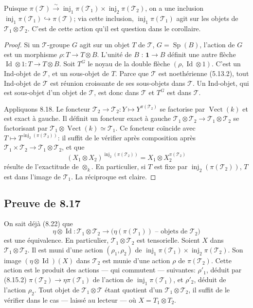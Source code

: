 \documentclass[12pt,a4paper]{article}
\theoremstyle{plain}
\theoremstyle{definition}
\DeclareMathOperator{\Sp}{Sp}
\DeclareMathOperator{\Id}{Id}
\DeclareMathOperator{\Vect}{Vect}
\DeclareMathOperator{\inj}{inj}
\begin{document}
Puisque $\pi(\mathcal{T}) \xrightarrow{\sim} \inj_1 \pi(\mathcal{T}_1) \times \inj_2 \pi(\mathcal{T}_2)$, on a une inclusion $\inj_1 \pi(\mathcal{T}_1) \hookrightarrow \pi(\mathcal{T})$; via cette inclusion, $\inj_1 \pi(\mathcal{T}_1)$ agit sur les objets de $\mathcal{T}_1 \otimes \mathcal{T}_2$. C'est de cette action qu'il est question dans le corollaire.

\begin{proof}
Si un $\mathcal{T}$-groupe $G$ agit sur un objet $T$ de $\mathcal{T}$, $G = \Sp(B)$, l'action de $G$ est un morphisme $\rho : T \to T \otimes B$. L'unité de $B$ : $\mathbf{1} \to B$ définit une autre flèche $\Id \otimes 1 : T \to T \otimes B$. Soit $T^G$ le noyau de la double flèche $(\rho, \Id \otimes 1)$. C'est un Ind-objet de $\mathcal{T}$, et un sous-objet de $T$. Parce que $\mathcal{T}$ est noethérienne (5.13.2), tout Ind-objet de $\mathcal{T}$ est réunion croissante de ses sous-objets dans $\mathcal{T}$. Un Ind-objet, qui est sous-objet d'un objet de $\mathcal{T}$, est donc dans $\mathcal{T}$ et $T^G$ est dans $\mathcal{T}$.

Appliquons 8.18. Le foncteur $\mathcal{T}_2 \to \mathcal{T}_2 : Y \mapsto Y^{\pi(\mathcal{T}_2)}$ se factorise par $\Vect(k)$ et est exact à gauche. Il définit un foncteur exact à gauche $\mathcal{T}_1 \otimes \mathcal{T}_2 \to \mathcal{T}_1 \otimes \mathcal{T}_2$ se factorisant par $\mathcal{T}_1 \otimes \Vect(k) \simeq \mathcal{T}_1$. Ce foncteur coïncide avec $T \mapsto T^{\inj_2(\pi(\mathcal{T}_2))}$: il suffit de le vérifier après composition après $\mathcal{T}_1 \times \mathcal{T}_2 \to \mathcal{T}_1 \otimes \mathcal{T}_2$, et que
\[
(X_1 \otimes X_2)^{\inj_2(\pi(\mathcal{T}_2))} = X_1 \otimes X_2^{\pi(\mathcal{T}_2)}
\]
résulte de l'exactitude de $\otimes_k$. En particulier, si $T$ est fixe par $\inj_2(\pi(\mathcal{T}_2))$, $T$ est dans l'image de $\mathcal{T}_1$. La réciproque est claire.
\end{proof}

\subsection{Preuve de 8.17}

On sait déjà (8.22) que
\[
\eta \otimes \Id : \mathcal{T}_1 \otimes \mathcal{T}_2 \to \text{($\eta(\pi(\mathcal{T}_1))$ -- objets de $\mathcal{T}_2$)}
\]
est une équivalence. En particulier, $\mathcal{T}_1 \otimes \mathcal{T}_2$ est tensorielle. Soient $X$ dans $\mathcal{T}_1 \otimes \mathcal{T}_2$. Il est muni d'une action $(\rho_1, \rho_2)$ de $\inj_1 \pi(\mathcal{T}_1) \times \inj_2 \pi(\mathcal{T}_2)$. Son image $(\eta \otimes \Id)(X)$ dans $\mathcal{T}_2$ est munie d'une action $\rho$ de $\pi(\mathcal{T}_2)$. Cette action est le produit des actions --- qui commutent --- suivantes: $\rho'_1$, déduit par (8.15.2) $\pi(\mathcal{T}_2) \to \eta \pi(\mathcal{T}_1)$ de l'action de $\inj_1 \pi(\mathcal{T}_1)$, et $\rho'_2$, déduit de l'action $\rho_2$. Tout objet de $\mathcal{T}_1 \otimes \mathcal{T}$ étant quotient d'un $\mathcal{T}_1 \otimes \mathcal{T}_2$, il suffit de le vérifier dans le cas --- laissé au lecteur --- où $X = T_1 \otimes T_2$.
\end{document}

